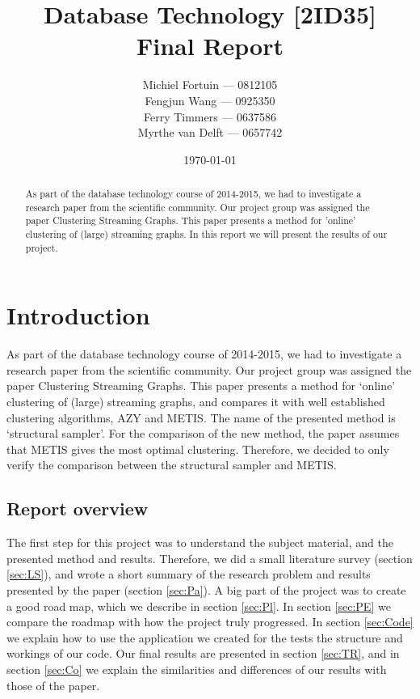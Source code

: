 \documentclass[a4paper]{article}
\title{Database Technology [2ID35] \\
\textbf{Final Report}}
\author{
Michiel Fortuin --- 0812105 \\
Fengjun Wang --- 0925350 \\
Ferry Timmers --- 0637586 \\
Myrthe van Delft --- 0657742}
\date{\today}
\begin{document}
\newcommand{\papername}[0]{Clustering Streaming Graphs}

\maketitle
\begin{abstract}
As part of the database technology course of 2014-2015, we had to investigate a research paper from the scientific community. Our project group was assigned the paper \papername. This paper presents a method for 'online' clustering of (large) streaming graphs. In this report we will present the results of our project.
\end{abstract}

\pagebreak
\tableofcontents

\pagebreak
\section{Introduction}\label{sec:In}
As part of the database technology course of 2014-2015, we had to investigate a research paper from the scientific community. Our project group was assigned the paper \papername \cite{paper}. This paper presents a method for `online' clustering of (large) streaming graphs, and compares it with well established clustering algorithms, AZY and METIS. The name of the presented method is `structural sampler'. For the comparison of the new method, the paper assumes that METIS gives the most optimal clustering. Therefore, we decided to only verify the comparison between the structural sampler and METIS. 


\subsection{Report overview}
The first step for this project was to understand the subject material, and the presented method and results. Therefore, we did a small literature survey (section \ref{sec:LS}), and wrote a short summary of the research problem and results presented by the paper (section \ref{sec:Pa}). A big part of the project was to create a good road map, which we describe in section \ref{sec:Pl}. In section \ref{sec:PE} we compare the roadmap with how the project truly progressed. In section \ref{sec:Code} we explain how to use the application we created for the tests the structure and workings of our code. Our final results are presented in section \ref{sec:TR}, and in section \ref{sec:Co} we explain the similarities and differences of our results with those of the paper.
\end{document}
